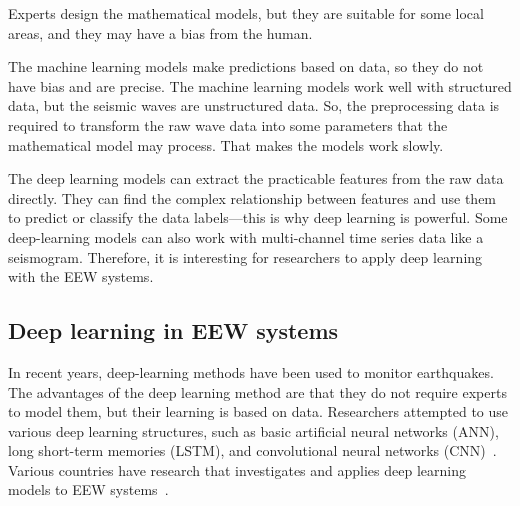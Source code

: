  Experts design the mathematical models, but they are suitable for some local areas, and they may have a bias from the human. 
 
 The machine learning models make predictions based on data, so they do not have bias and are precise. The machine learning models work well with structured data, but the seismic waves are unstructured data. So, the preprocessing data is required to transform the raw wave data into some parameters that the mathematical model may process. That makes the models work slowly.

The deep learning models can extract the practicable features from the raw data directly. They can find the complex relationship between features and use them to predict or classify the data labels—this is why deep learning is powerful. Some deep-learning models can also work with multi-channel time series data like a seismogram. Therefore, it is interesting for researchers to apply deep learning with the EEW systems.


\subsection{Deep learning in EEW systems}

In recent years, deep-learning methods have been used to monitor earthquakes. The advantages of the deep learning method are that they do not require experts to model them, but their learning is based on data. Researchers attempted to use various deep learning structures, such as basic artificial neural networks (ANN),  long short-term memories (LSTM), and convolutional neural networks (CNN)~\cite{chiang2022neural, jozinovic2020rapid, li2018machine, mousavi2020machine}. Various countries have research that investigates and applies deep learning models to EEW systems~\cite{gasparini2007earthquake, hsiao2009development}.

